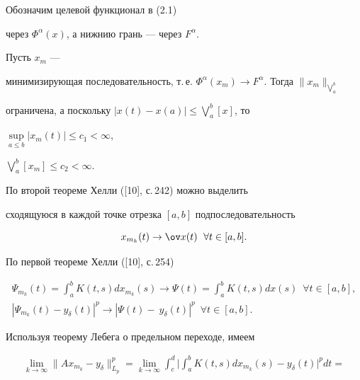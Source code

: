 \begin{pf}


Обозначим целевой функционал в (2.1)


через $\Phi^\alpha(x)$, а нижнию грань --- через $F^\alpha$.


Пусть $x_m$ ---


минимизирующая последовательность, т.\,е. $ \Phi^\alpha(x_m) \to


F^\alpha$. Тогда ${\displaystyle \|x_m\|_


{\bigvee \limits_a^b}}$


ограничена, а поскольку $|x(t) - x(a)| \le \bigvee\limits_a^b[x]$, то


$\sup \limits_{a \le b}|x_m(t)|\le c_1<\infty$,


$\bigvee\limits_a^b[x_m]\le c_2< \infty$.





По второй теореме Хелли ([10], с.\,242) можно выделить


сходящуюся в каждой точке отрезка $[a,b]$ подпоследовательность


$$


x_{m_k}(t) \to \ov x(t)\ \; \forall t\in [a,b].


$$





По первой теореме Хелли ([10], с.\,254)


\begin{gather*}


\Psi_{m_k}(t) =\int_a^bK(t,s)dx_{m_k}(s)


\to\Psi(t) =\int_a^b K(t,s)dx(s)\ \; \forall t\in[a,b], \\


%


|\Psi_{m_k}(t) - y_{\delta}(t)|^p \to |\Psi(t) -\


y_\delta(t)|^p\ \; \forall t\in [a,b].


\end{gather*}


Используя теорему Лебега о предельном переходе, имеем


\begin{multline*}


\lim_{k\to\infty}\|Ax_{m_k}-y_\delta\|_{L_p}^p =


\lim_{k\to\infty}\int_c^d\bigg|\int_a^bK(t,s)


dx_{m_k}(s)- y_\delta(t)\bigg|^p dt= \\



\end{multline*}
\end{pf}
